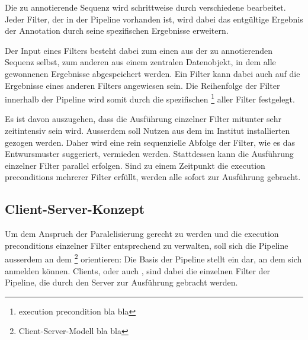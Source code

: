 Die zu annotierende Sequenz wird schrittweise durch verschiedene 
bearbeitet. Jeder Filter, der in der Pipeline vorhanden ist, wird dabei das
entgültige Ergebnis der Annotation durch seine spezifischen Ergebnisse
erweitern.

Der Input eines Filters besteht dabei zum einen aus der zu
annotierenden Sequenz selbst, zum anderen aus einem zentralen Datenobjekt, in
dem alle gewonnenen Ergebnisse abgespeichert werden.
Ein Filter kann dabei auch auf die Ergebnisse eines anderen
Filters angewiesen sein. Die Reihenfolge der Filter innerhalb der Pipeline wird
somit durch die spezifischen 
\footnote{execution precondition bla bla} aller Filter festgelegt.

Es ist davon auszugehen, dass die Ausführung einzelner Filter mitunter sehr
zeitintensiv sein wird. Ausserdem soll Nutzen aus dem im Institut installierten
 gezogen werden. Daher wird eine rein sequenzielle Abfolge der
Filter, wie es das Entwursmuster suggeriert, vermieden werden.
Stattdessen kann die Ausführung einzelner Filter parallel erfolgen.
Sind zu einem Zeitpunkt die execution preconditions mehrerer Filter erfüllt,
werden alle sofort zur Ausführung gebracht.

\subsection{Client-Server-Konzept}
Um dem Anspruch der Paralelisierung gerecht zu werden und die execution
preconditions einzelner Filter entsprechend zu verwalten, soll sich die Pipeline
ausserdem an dem 
\footnote{Client-Server-Modell bla bla} orientieren:
Die Basis der Pipeline stellt ein  dar, an dem sich
 anmelden können.
Clients, oder auch , sind dabei die einzelnen Filter der
Pipeline, die durch den Server zur Ausführung gebracht werden.

